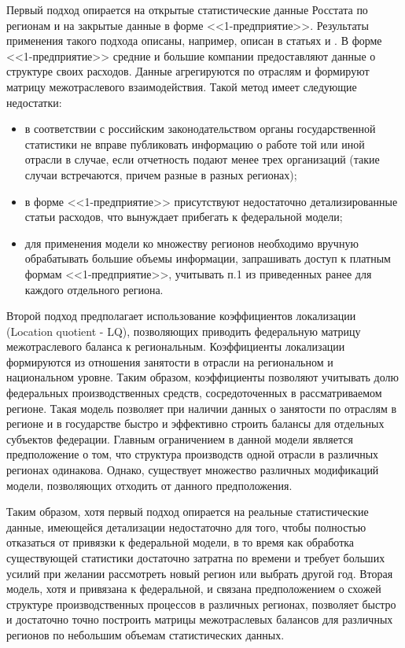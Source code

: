 \documentclass[12pt, a4paper]{article}
\begin{document}
Первый подход опирается на открытые статистические данные Росстата по регионам и на закрытые данные в форме <<1-предприятие>>. Результаты применения такого подхода описаны, например, описан в статьях \cite{MOB_stat1} и \cite{MOB_stat2}. В форме <<1-предприятие>> средние и большие компании предоставляют данные о структуре своих расходов. Данные агрегируются по отраслям и формируют матрицу межотраслевого взаимодействия. Такой метод имеет следующие недостатки:
\begin{itemize}
\item в соответствии с российским законодательством органы государственной статистики не вправе публиковать информацию о работе той или иной отрасли в случае, если отчетность подают менее трех организаций (такие случаи встречаются, причем разные в разных регионах);
\item в форме <<1-предприятие>> присутствуют недостаточно детализированные статьи расходов, что вынуждает прибегать к федеральной модели;
\item для применения модели ко множеству регионов необходимо вручную обрабатывать большие объемы информации, запрашивать доступ к платным формам <<1-предприятие>>, учитывать п.1 из приведенных ранее для каждого отдельного региона.
\end{itemize}

Второй подход предполагает использование коэффициентов локализации (Location quotient - LQ), позволяющих приводить федеральную матрицу межотраслевого баланса к региональным. Коэффициенты локализации формируются из отношения занятости в отрасли на региональном и национальном уровне. Таким образом, коэффициенты позволяют учитывать долю федеральных производственных средств, сосредоточенных в рассматриваемом регионе. Такая модель позволяет при наличии данных о занятости по отраслям в регионе и в государстве быстро и эффективно строить балансы для отдельных субъектов федерации. Главным ограничением в данной модели является предположение о том, что структура производств одной отрасли в различных регионах одинакова. Однако, существует множество различных модификаций модели, позволяющих отходить от данного предположения.

Таким образом, хотя первый подход опирается на реальные статистические данные, имеющейся детализации недостаточно для того, чтобы полностью отказаться от привязки к федеральной модели, в то время как обработка существующей статистики достаточно затратна по времени и требует больших усилий при желании рассмотреть новый регион или выбрать другой год. Вторая модель, хотя и привязана к федеральной, и связана предположением о схожей структуре производственных процессов в различных регионах, позволяет быстро и достаточно точно построить матрицы межотраслевых балансов для различных регионов по небольшим объемам статистических данных.
\end{document}
